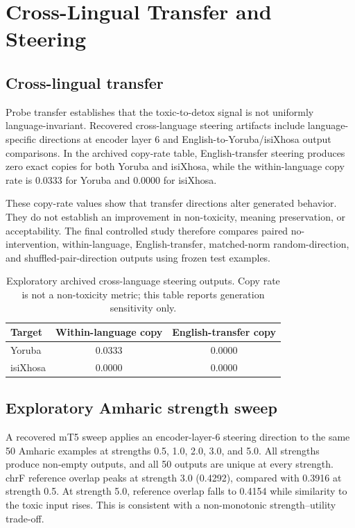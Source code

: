 \section{Cross-Lingual Transfer and Steering}

\subsection{Cross-lingual transfer}

Probe transfer establishes that the toxic-to-detox signal is not uniformly
language-invariant. Recovered cross-language steering artifacts include
language-specific directions at encoder layer 6 and English-to-Yoruba/isiXhosa output
comparisons. In the archived copy-rate table, English-transfer steering produces zero
exact copies for both Yoruba and isiXhosa, while the within-language copy rate is
0.0333 for Yoruba and 0.0000 for isiXhosa.

These copy-rate values show that transfer directions alter generated behavior. They do
not establish an improvement in non-toxicity, meaning preservation, or acceptability.
The final controlled study therefore compares paired no-intervention, within-language,
English-transfer, matched-norm random-direction, and shuffled-pair-direction outputs
using frozen test examples.

\begin{table}[t]
\centering
\small
\begin{tabular}{lcc}
\toprule
Target & Within-language copy & English-transfer copy \\
\midrule
Yoruba & 0.0333 & 0.0000 \\
isiXhosa & 0.0000 & 0.0000 \\
\bottomrule
\end{tabular}
\caption{Exploratory archived cross-language steering outputs. Copy rate is not a
non-toxicity metric; this table reports generation sensitivity only.}
\label{tab:cross-language-exploratory}
\end{table}

\subsection{Exploratory Amharic strength sweep}

A recovered mT5 sweep applies an encoder-layer-6 steering direction to the same 50
Amharic examples at strengths 0.5, 1.0, 2.0, 3.0, and 5.0. All strengths produce
non-empty outputs, and all 50 outputs are unique at every strength. chrF
reference overlap peaks at strength 3.0 (0.4292), compared with 0.3916 at strength
0.5. At strength 5.0, reference overlap falls to 0.4154 while similarity to the toxic
input rises. This is consistent with a non-monotonic strength--utility trade-off.

